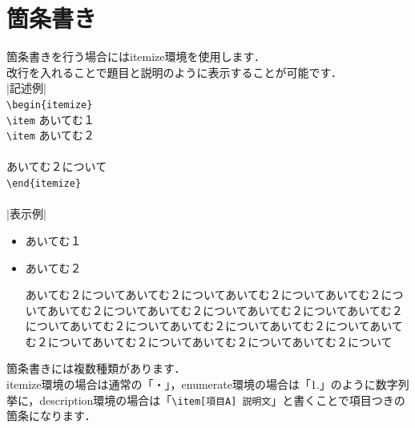 \section{箇条書き}
\label{sec:tex_basic_clause}
    箇条書きを行う場合にはitemize環境を使用します．\\
    改行を入れることで題目と説明のように表示することが可能です．\\
    |記述例|\\
    \verb|\begin{itemize}|\\
        \verb|\item| あいてむ１\\
        \verb|\item| あいてむ２\\\\
        あいてむ２について\\
    \verb|\end{itemize}|\\\\
    |表示例|
\begin{itemize}
    \item あいてむ１
    \item あいてむ２

    あいてむ２についてあいてむ２についてあいてむ２についてあいてむ２についてあいてむ２についてあいてむ２についてあいてむ２についてあいてむ２についてあいてむ２についてあいてむ２についてあいてむ２についてあいてむ２についてあいてむ２についてあいてむ２についてあいてむ２について
\end{itemize} 

    箇条書きには複数種類があります．\\
    itemize環境の場合は通常の「・」，enumerate環境の場合は「1.」のように数字列挙に，description環境の場合は「\verb|\item[項目A] 説明文|」と書くことで項目つきの箇条になります．